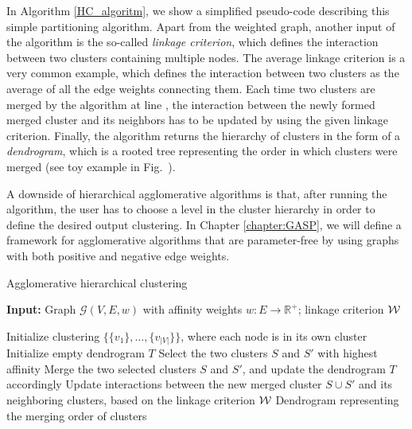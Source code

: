 In Algorithm \ref{HC_algoritm}, we show a simplified pseudo-code describing this simple partitioning algorithm. Apart from the weighted graph, another input of the algorithm is the so-called \emph{linkage criterion}, which defines the interaction between two clusters containing multiple nodes. The average linkage criterion is a very common example, which defines the interaction between two clusters as the average of all the edge weights connecting them. Each time two clusters are merged by the algorithm at line , the interaction between the newly formed merged cluster and its neighbors has to be updated by using the given linkage criterion. 
Finally, the algorithm returns the hierarchy of clusters in the form of a \emph{dendrogram}, which is a rooted tree representing the order in which clusters were merged (see toy example in Fig.~). 

A downside of hierarchical agglomerative algorithms is that, after running the algorithm, the user has to choose a level in the cluster hierarchy in order to define the desired output clustering. 
In Chapter \ref{chapter:GASP}, we will define a framework for agglomerative algorithms that are parameter-free by using graphs with both positive and negative edge weights.

\begin{algorithm}[t]
\footnotesize
  \begin{flushleft}
  \footnotesize
  \caption{Agglomerative hierarchical clustering}
   \hspace*{\algorithmicindent} \textbf{Input:} Graph $\mathcal{G}(V,E,w)$ with affinity weights $w:E \rightarrow \mathbb{R}^+$; linkage criterion $\mathcal{W}{}$ \\
  \begin{algorithmic}[1]
  \footnotesize
      \State Initialize clustering $\{\{v_1\}, \ldots, \{v_{|V|}\}\}$, where each node is in its own cluster
      \State Initialize empty dendrogram $T$
      \Repeat 
        \State Select the two clusters $S$ and $S'$ with highest affinity
        \State Merge the two selected clusters $S$ and $S'$, and update the dendrogram $T$ accordingly
        \State Update interactions between the new merged cluster $S \cup S'$ and its neighboring clusters, based on the linkage criterion $\mathcal{W}{}$
      \State
      \Return Dendrogram representing the merging order of clusters
  \end{algorithmic}
    \label{HC_algoritm}
  \end{flushleft}

\end{algorithm}


